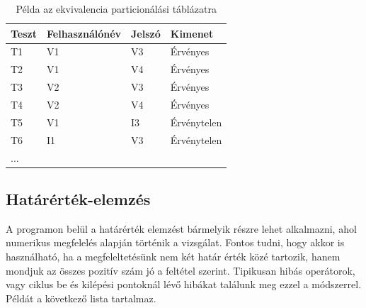 \begin{table} [h]
	\begin{center}
		\begin{tabular}{| p{3cm} | p{3cm} | p{3cm} | p{3cm} |}
			\hline
			Teszt & Felhasználónév & Jelszó & Kimenet \\
			\hline
			T1 & V1 & V3 & Érvényes \\
			\hline
			T2 & V1 & V4 & Érvényes \\
			\hline
			T3 & V2 & V3 & Érvényes \\
			\hline
			T4 & V2 & V4 & Érvényes \\
			\hline
			T5 & V1 & I3 & Érvénytelen \\
			\hline
			T6 & I1 & V3 & Érvénytelen \\
			\hline
			... & & & \\
			\hline
			\end{tabular}
	\end{center}
	\caption{Példa az ekvivalencia particionálási táblázatra}
\end{table}

\subsection{Határérték-elemzés} A programon belül a határérték elemzést bármelyik részre lehet alkalmazni, ahol numerikus megfelelés alapján történik a vizsgálat. Fontos tudni, hogy akkor is használható, ha a megfeleltetésünk nem két határ érték közé tartozik, hanem mondjuk az összes pozitív szám jó a feltétel szerint. Tipikusan hibás operátorok, vagy ciklus be és kilépési pontoknál lévő hibákat találunk meg ezzel a módszerrel. Példát a következő lista tartalmaz.

